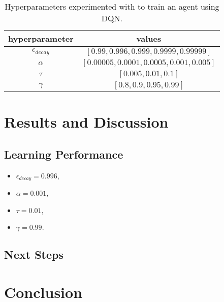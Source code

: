 \documentclass[11pt]{article}
\begin{document}
\begin{table}[!ht]
	\centering
	\begin{tabular}{ c | c }
	\textbf{hyperparameter} & \textbf{values} \\
	\hline
	$\epsilon_{decay}$ & $[0.99, 0.996, 0.999, 0.9999, 0.99999]$ \\
	$\alpha$ & $[0.00005, 0.0001, 0.0005, 0.001, 0.005]$ \\
	$\tau$ & $[0.005, 0.01, 0.1]$ \\
	$\gamma$ & $[0.8, 0.9, 0.95, 0.99]$ \\
	\hline
	\end{tabular}
	\caption{Hyperparameters experimented with to train an agent using DQN.}
	\label{tbl:parameters}
\end{table}

\FloatBarrier

\section{Results and Discussion}

\subsection{Learning Performance}

\FloatBarrier

\begin{figure}[!ht]
	\centering
	\caption{}
	\label{fig:d4pg-results}
\end{figure}

\FloatBarrier

\begin{itemize}
	\item $\epsilon_{decay} = 0.996$,
	\item $\alpha = 0.001$,
	\item $\tau = 0.01$,
	\item $\gamma = 0.99$.
\end{itemize}

\subsection{Next Steps}

\section{Conclusion}



\end{document}

